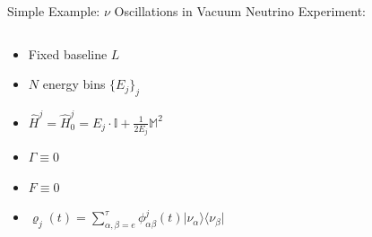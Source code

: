 \documentclass[]{beamer}
\begin{document}
\begin{frame}{Simple Example: \(\nu\) Oscillations in Vacuum}
  Neutrino Experiment:
  \begin{columns}
    \begin{column}{0.5\textwidth}
      \begin{itemize}
        \item Fixed baseline \(L\)
        \item \(N\) energy bins \(\{E_j\}_j\)
        \item \(\hat{H}^j = \hat{H}_0^j = E_j \cdot \mathbb{I} + \frac{1}{2E_j} \mathbb{M}^2\)
        \item \(\Gamma \equiv 0\)
        \item \(F \equiv 0\)
        \item \(\varrho_j(t) = \sum_{\alpha, \beta = e}^{\tau} \phi_{\alpha\beta}^j(t) \vert \nu_\alpha \rangle \langle \nu_\beta \vert\)
      \end{itemize}
    \end{column}
    \begin{column}{0.5\textwidth}
    \end{column}
  \end{columns}
\end{frame}
\end{document}
